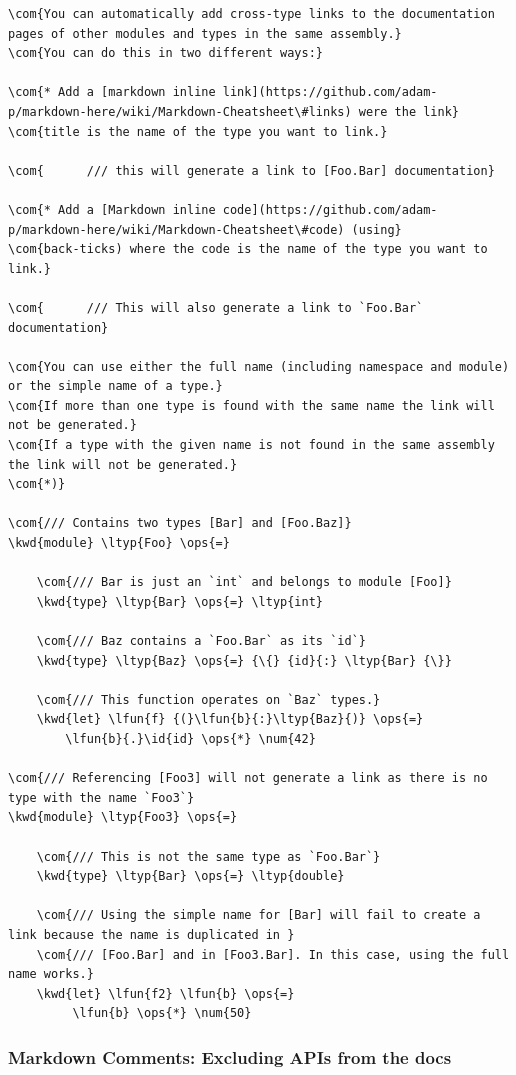 \documentclass{article}
\newcommand{\id}[1]{\textcolor{black}{#1}}
\newcommand{\com}[1]{\textcolor{officegreen}{#1}}
\newcommand{\kwd}[1]{\textcolor{navy}{#1}}
\newcommand{\num}[1]{\textcolor{officegreen}{#1}}
\newcommand{\ops}[1]{\textcolor{purple}{#1}}
\begin{document}
\begin{Verbatim}[commandchars=\\\{\}]
\com{You can automatically add cross-type links to the documentation pages of other modules and types in the same assembly.}
\com{You can do this in two different ways:}

\com{* Add a [markdown inline link](https://github.com/adam-p/markdown-here/wiki/Markdown-Cheatsheet\#links) were the link}
\com{title is the name of the type you want to link.}

\com{      /// this will generate a link to [Foo.Bar] documentation}

\com{* Add a [Markdown inline code](https://github.com/adam-p/markdown-here/wiki/Markdown-Cheatsheet\#code) (using}
\com{back-ticks) where the code is the name of the type you want to link.}

\com{      /// This will also generate a link to `Foo.Bar` documentation}

\com{You can use either the full name (including namespace and module) or the simple name of a type.}
\com{If more than one type is found with the same name the link will not be generated.}
\com{If a type with the given name is not found in the same assembly the link will not be generated.}
\com{*)}

\com{/// Contains two types [Bar] and [Foo.Baz]}
\kwd{module} \ltyp{Foo} \ops{=} 
    
    \com{/// Bar is just an `int` and belongs to module [Foo]}
    \kwd{type} \ltyp{Bar} \ops{=} \ltyp{int}
    
    \com{/// Baz contains a `Foo.Bar` as its `id`}
    \kwd{type} \ltyp{Baz} \ops{=} {\{} {id}{:} \ltyp{Bar} {\}}

    \com{/// This function operates on `Baz` types.}
    \kwd{let} \lfun{f} {(}\lfun{b}{:}\ltyp{Baz}{)} \ops{=} 
        \lfun{b}{.}\id{id} \ops{*} \num{42}

\com{/// Referencing [Foo3] will not generate a link as there is no type with the name `Foo3`}
\kwd{module} \ltyp{Foo3} \ops{=}
    
    \com{/// This is not the same type as `Foo.Bar`}
    \kwd{type} \ltyp{Bar} \ops{=} \ltyp{double}

    \com{/// Using the simple name for [Bar] will fail to create a link because the name is duplicated in }
    \com{/// [Foo.Bar] and in [Foo3.Bar]. In this case, using the full name works.}
    \kwd{let} \lfun{f2} \lfun{b} \ops{=}
         \lfun{b} \ops{*} \num{50}
\end{Verbatim}

\subsubsection*{Markdown Comments: Excluding APIs from the docs}
\end{document}
